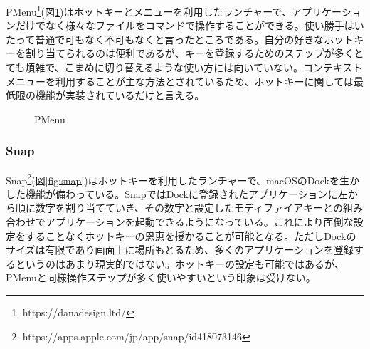 PMenu\footnote{https://danadesign.ltd/}(図\ref{fig:pmenu})はホットキーとメニューを利用したランチャーで、アプリケーションだけでなく様々なファイルをコマンドで操作することができる。使い勝手はいたって普通で可もなく不可もなくと言ったところである。自分の好きなホットキーを割り当てられるのは便利であるが、キーを登録するためのステップが多くとても煩雑で、こまめに切り替えるような使い方には向いていない。コンテキストメニューを利用することが主な方法とされているため、ホットキーに関しては最低限の機能が実装されているだけと言える。

\begin{figure}[h]
    \begin{center}
    \end{center}
    \caption{PMenu}
    \label{fig:pmenu}
\end{figure}

\subsubsection{Snap}

Snap\footnote{https://apps.apple.com/jp/app/snap/id418073146}(図\ref{fig:snap})はホットキーを利用したランチャーで、macOSのDockを生かした機能が備わっている。SnapではDockに登録されたアプリケーションに左から順に数字を割り当てていき、その数字と設定したモディファイアキーとの組み合わせでアプリケーションを起動できるようになっている。これにより面倒な設定をすることなくホットキーの恩恵を授かることが可能となる。ただしDockのサイズは有限であり画面上に場所もとるため、多くのアプリケーションを登録するというのはあまり現実的ではない。ホットキーの設定も可能ではあるが、PMenuと同様操作ステップが多く使いやすいという印象は受けない。

